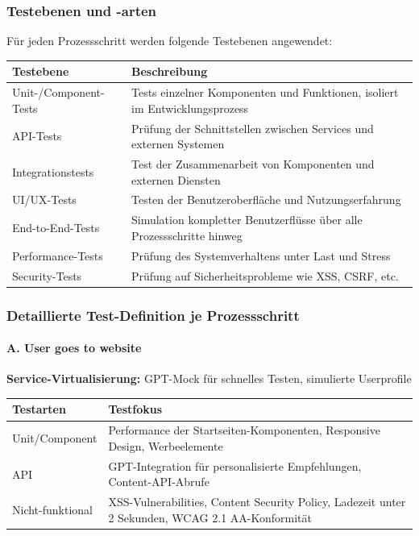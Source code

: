 \subsubsection{Testebenen und -arten}
Für jeden Prozessschritt werden folgende Testebenen angewendet:
\begin{longtable}{|p{3cm}|p{12cm}|}
\hline
\textbf{Testebene} & \textbf{Beschreibung} \\
\hline
Unit-/Component-Tests & Tests einzelner Komponenten und Funktionen, isoliert im Entwicklungsprozess \\
\hline
API-Tests & Prüfung der Schnittstellen zwischen Services und externen Systemen \\
\hline
Integrationstests & Test der Zusammenarbeit von Komponenten und externen Diensten \\
\hline
UI/UX-Tests & Testen der Benutzeroberfläche und Nutzungserfahrung \\
\hline
End-to-End-Tests & Simulation kompletter Benutzerflüsse über alle Prozessschritte hinweg \\
\hline
Performance-Tests & Prüfung des Systemverhaltens unter Last und Stress \\
\hline
Security-Tests & Prüfung auf Sicherheitsprobleme wie XSS, CSRF, etc. \\
\hline
\end{longtable}

\subsubsection{Detaillierte Test-Definition je Prozessschritt}

\paragraph{A. User goes to website \\}
\textbf{Service-Virtualisierung:} GPT-Mock für schnelles Testen, simulierte Userprofile \\
\begin{tabular}{|p{3cm}|p{12cm}|} 
\hline
\textbf{Testarten} & \textbf{Testfokus} \\
\hline
Unit/Component & Performance der Startseiten-Komponenten, Responsive Design, Werbeelemente \\
\hline
API & GPT-Integration für personalisierte Empfehlungen, Content-API-Abrufe \\
\hline
Nicht-funktional & XSS-Vulnerabilities, Content Security Policy, Ladezeit unter 2 Sekunden, WCAG 2.1 AA-Konformität \\
\hline
\end{tabular}


